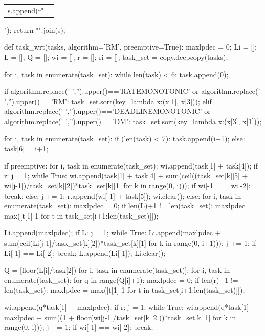 \documentclass[
	10pt,				%
	openright,			%
	oneside,			%
	a4paper,			%
	english,			%
	french,				%
	spanish,			%
	brazil,				%
	]{abntex2}
\newcommand{\ª}{%
\textordfeminine
}
\begin{document}
\begin{sagesilent}
\begin{tabular}{|c|c|}
    s.append(r"\end{tabular}");
    return "".join(s);

def task_wrt(tasks, algorithm='RM', preemptive=True):
    maxlpdec = 0;
    Li = [];
    L = [];
    Q = [];
    wi = [];
    r = [];
    ri = [];
    task_set = copy.deepcopy(tasks);
    
    for i, task in enumerate(task_set):
        while len(task) < 6:
            task.append(0);
    
    if algorithm.replace(' ','').upper()=='RATEMONOTONIC' or algorithm.replace(' ','').upper()=='RM':
        task_set.sort(key=lambda x:(x[1], x[3]));
    elif algorithm.replace(' ','').upper()=='DEADLINEMONOTONIC' or algorithm.replace(' ','').upper()=='DM':
        task_set.sort(key=lambda x:(x[3], x[1]));
            
    for i, task in enumerate(task_set):
        if (len(task) < 7):
            task.append(i+1);
        else:
            task[6] = i+1;

    if preemptive:
        for i, task in enumerate(task_set):
            wi.append(task[1] + task[4]);
            if r:
                j = 1;
                while True:
                    wi.append(task[1] + task[4] + sum(ceil((task_set[k][5] + wi[j-1])/task_set[k][2])*task_set[k][1] for k in range(0, i)));
                    if wi[-1] == wi[-2]:
                        break;
                    else:
                        j += 1;
            r.append(wi[-1] + task[5]);
            wi.clear();
    else:
        for i, task in enumerate(task_set):
            maxlpdec = 0;
            if len(L)+1 != len(task_set):
                maxlpdec = max([t[1]-1 for t in task_set[i+1:len(task_set)]]);

            Li.append(maxlpdec);
            if L:
                j = 1;
                while True:
                    Li.append(maxlpdec + sum(ceil(Li[j-1]/task_set[k][2])*task_set[k][1] for k in range(0, i+1)));
                    j += 1;
                    if Li[-1] == Li[-2]:
                        break;
            L.append(Li[-1]);
            Li.clear();

        Q = [floor(L[i]/task[2]) for i, task in enumerate(task_set)];
        for i, task in enumerate(task_set):
            for q in range(Q[i]+1):
                maxlpdec = 0;
                if len(r)+1 != len(task_set):
                    maxlpdec = max([t[1]-1 for t in task_set[i+1:len(task_set)]]);

                wi.append(q*task[1] + maxlpdec);
                if r:
                    j = 1;
                    while True:
                        wi.append(q*task[1] + maxlpdec + sum((1 + floor(wi[j-1]/task_set[k][2]))*task_set[k][1] for k in range(0, i)));
                        j += 1;
                        if wi[-1] == wi[-2]:
                            break;


\end{sagesilent}
\end{document}

